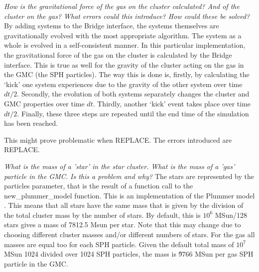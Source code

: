 \documentclass{aa}
\begin{document}


\textit{How is the gravitational force of the gas on the cluster calculated? And of the cluster on the gas? What errors could this introduce? How could these be solved?}
By adding systems to the Bridge interface, the systems themselves are gravitationally evolved with the most appropriate algorithm. The system as a whole is evolved in a self-consistent manner. In this particular implementation, the gravitational force of the gas on the cluster is calculated by the Bridge interface. This is true as well for the gravity of the cluster acting on the gas in the GMC (the SPH particles). The way this is done is, firstly, by calculating the `kick' one system experiences due to the gravity of the other system over time $dt/2$. Secondly, the evolution of both systems separately changes the cluster and GMC properties over time $dt$. Thirdly, another `kick' event takes place over time $dt/2$. Finally, these three steps are repeated until the end time of the simulation has been reached.

This might prove problematic when REPLACE. The errors introduced are REPLACE.

\textit{What is the mass of a 'star' in the star cluster. What is the mass of a 'gas' particle in the GMC. Is this a problem and why?} The stars are represented by the particles parameter, that is the result of a function call to the new\_plummer\_model function. This is an implementation of the Plummer model \citep{1911MNRAS..71..460P}. This means that all stars have the same mass that is given by the division of the total cluster mass by the number of stars. By default, this is $10^6$ MSun/128 stars gives a mass of 7812.5 Msun per star. Note that this may change due to choosing different cluster masses and/or different numbers of stars. For the gas all masses are equal too for each SPH particle. Given the default total mass of $10^7$ MSun 1024 divided over 1024 SPH particles, the mass is \~9766 MSun per gas SPH particle in the GMC. 
\end{document}
